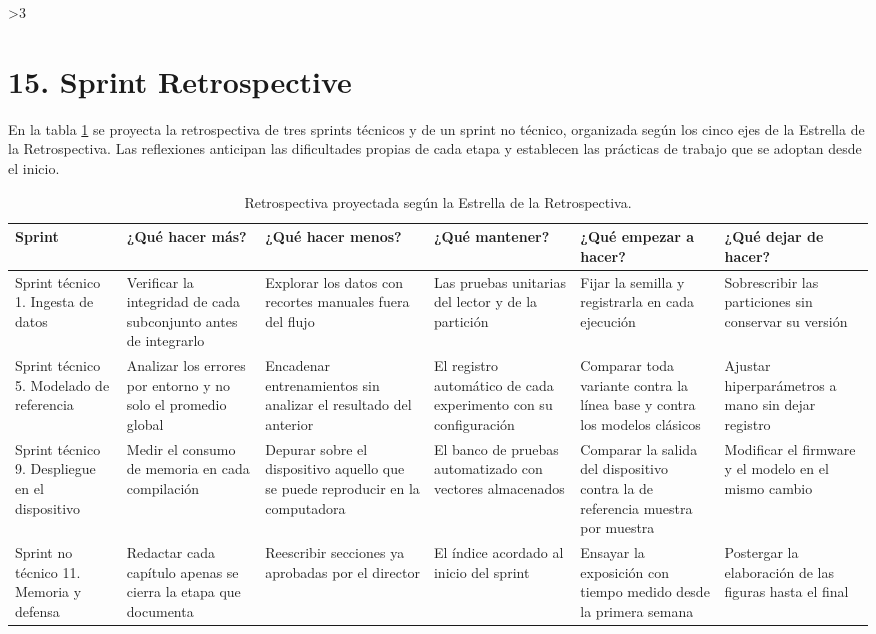 \documentclass[
11pt, %
]{charter}
\providecommand{\revision}{1}
\begin{document}
\else\fi

\ifnum\revision>3
\section{15. Sprint Retrospective}
\label{sec:sprint_retro}

En la tabla \ref{tab:retro} se proyecta la retrospectiva de tres sprints técnicos y de un sprint no técnico, organizada según los cinco ejes de la Estrella de la Retrospectiva. Las reflexiones anticipan las dificultades propias de cada etapa y establecen las prácticas de trabajo que se adoptan desde el inicio.

\begin{table}[htpb]
\centering
\caption{Retrospectiva proyectada según la Estrella de la Retrospectiva.}
\label{tab:retro}
\renewcommand{\arraystretch}{1.4}
\setlength{\tabcolsep}{3pt}
\scriptsize
\begin{tabular}{|>{\raggedright\arraybackslash}p{1.8cm}|
                >{\raggedright\arraybackslash}p{2.4cm}|
                >{\raggedright\arraybackslash}p{2.4cm}|
                >{\raggedright\arraybackslash}p{2.4cm}|
                >{\raggedright\arraybackslash}p{2.4cm}|
                >{\raggedright\arraybackslash}p{2.4cm}|}
\hline
\rowcolor[HTML]{CCCCCC}
\textbf{Sprint} & \textbf{¿Qué hacer más?} & \textbf{¿Qué hacer menos?} & \textbf{¿Qué mantener?} & \textbf{¿Qué empezar a hacer?} & \textbf{¿Qué dejar de hacer?} \\
\hline
Sprint técnico 1. Ingesta de datos & Verificar la integridad de cada subconjunto antes de integrarlo & Explorar los datos con recortes manuales fuera del flujo & Las pruebas unitarias del lector y de la partición & Fijar la semilla y registrarla en cada ejecución & Sobrescribir las particiones sin conservar su versión \\
\hline
Sprint técnico 5. Modelado de referencia & Analizar los errores por entorno y no solo el promedio global & Encadenar entrenamientos sin analizar el resultado del anterior & El registro automático de cada experimento con su configuración & Comparar toda variante contra la línea base y contra los modelos clásicos & Ajustar hiperparámetros a mano sin dejar registro \\
\hline
Sprint técnico 9. Despliegue en el dispositivo & Medir el consumo de memoria en cada compilación & Depurar sobre el dispositivo aquello que se puede reproducir en la computadora & El banco de pruebas automatizado con vectores almacenados & Comparar la salida del dispositivo contra la de referencia muestra por muestra & Modificar el firmware y el modelo en el mismo cambio \\
\hline
Sprint no técnico 11. Memoria y defensa & Redactar cada capítulo apenas se cierra la etapa que documenta & Reescribir secciones ya aprobadas por el director & El índice acordado al inicio del sprint & Ensayar la exposición con tiempo medido desde la primera semana & Postergar la elaboración de las figuras hasta el final \\
\hline
\end{tabular}
\end{table}
\else\fi
\end{document}
